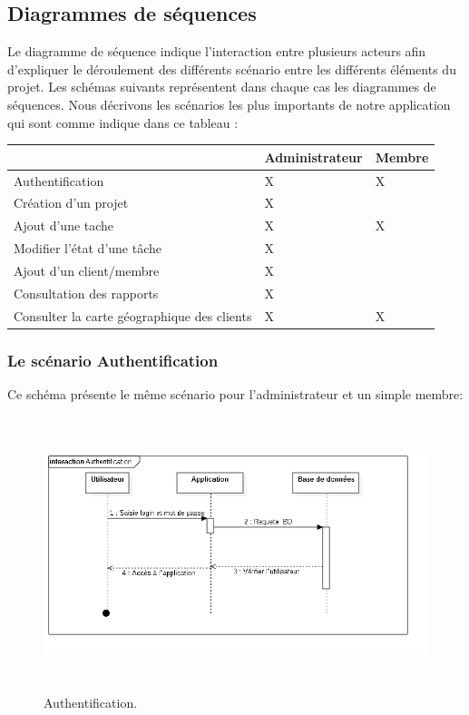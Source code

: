 \subsection{Diagrammes de s\'{e}quences}
Le diagramme de s\'{e}quence indique l'interaction entre plusieurs acteurs
afin d'expliquer le d\'{e}roulement des diff\'{e}rents sc\'{e}nario entre les diff\'{e}rents
\'{e}l\'{e}ments du projet. Les sch\'{e}mas suivants repr\'{e}sentent dans chaque cas les
diagrammes de s\'{e}quences.
Nous  d\'{e}crivons les sc\'{e}narios les plus importants de notre application qui sont
comme indique dans ce tableau :

\FloatBarrier
\begin{table}[H]
\centering
\begin{tabular}{|l|l|l|}
\hline
                                            & Administrateur & Membre  \\
\hline
Authentification~                           & X              & X       \\
\hline
Création d’un projet                        & X              &         \\
\hline
Ajout d’une tache                           & X              & X       \\
\hline
Modifier l’état d’une tâche                 & X              &         \\
\hline
Ajout d’un client/membre                    & X              &         \\
\hline
Consultation des rapports                   & X              &         \\
\hline
Consulter la carte géographique des clients & X              & X       \\
\hline
\end{tabular}
\end{table}
\FloatBarrier


\newpage

\subsubsection{ Le sc\'{e}nario \guillemotleft{} Authentification \guillemotright{}}
Ce sch\'{e}ma pr\'{e}sente le m\^{e}me sc\'{e}nario pour l'administrateur et un simple
membre:


\begin{figure}[H]
\center
\includegraphics[width=14cm,height=8cm]{./figures/seq/A.png}
\caption{Authentification.}
\end{figure}

